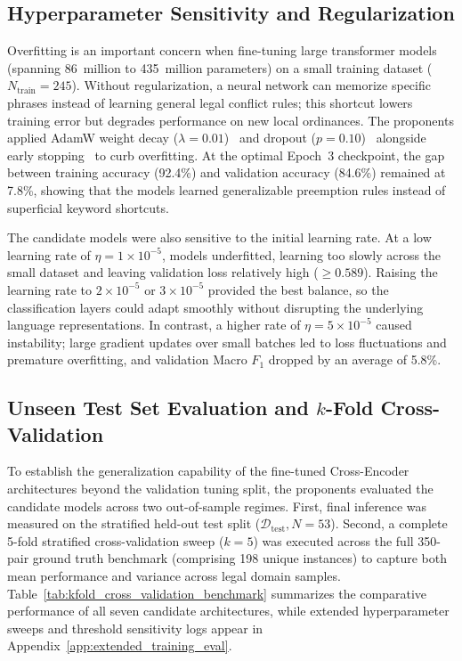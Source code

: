 \subsection{Hyperparameter Sensitivity and Regularization}
Overfitting is an important concern when fine-tuning large transformer models (spanning 86~million to 435~million parameters) on a small training dataset ($N_{\text{train}} = 245$). Without regularization, a neural network can memorize specific phrases instead of learning general legal conflict rules; this shortcut lowers training error but degrades performance on new local ordinances. The proponents applied AdamW weight decay ($\lambda = 0.01$)~\cite{loshchilov2019decoupled} and dropout ($p = 0.10$)~\cite{srivastava2014dropout} alongside early stopping~\cite{prechelt1998early} to curb overfitting. At the optimal Epoch~3 checkpoint, the gap between training accuracy (92.4\%) and validation accuracy (84.6\%) remained at 7.8\%, showing that the models learned generalizable preemption rules instead of superficial keyword shortcuts.

The candidate models were also sensitive to the initial learning rate. At a low learning rate of $\eta = 1\times 10^{-5}$, models underfitted, learning too slowly across the small dataset and leaving validation loss relatively high ($\ge 0.589$). Raising the learning rate to $2\times 10^{-5}$ or $3\times 10^{-5}$ provided the best balance, so the classification layers could adapt smoothly without disrupting the underlying language representations. In contrast, a higher rate of $\eta = 5\times 10^{-5}$ caused instability; large gradient updates over small batches led to loss fluctuations and premature overfitting, and validation Macro $F_1$ dropped by an average of 5.8\%.


\subsection{Unseen Test Set Evaluation and \texorpdfstring{$k$}{k}-Fold Cross-Validation}
\label{sec:kfold_test_evaluation}

To establish the generalization capability of the fine-tuned Cross-Encoder architectures beyond the validation tuning split, the proponents evaluated the candidate models across two out-of-sample regimes. First, final inference was measured on the stratified held-out test split ($\mathcal{D}_{\text{test}}, N = 53$). Second, a complete 5-fold stratified cross-validation sweep ($k = 5$) was executed across the full 350-pair ground truth benchmark (comprising 198 unique instances) to capture both mean performance and variance across legal domain samples. Table~\ref{tab:kfold_cross_validation_benchmark} summarizes the comparative performance of all seven candidate architectures, while extended hyperparameter sweeps and threshold sensitivity logs appear in Appendix~\ref{app:extended_training_eval}.

